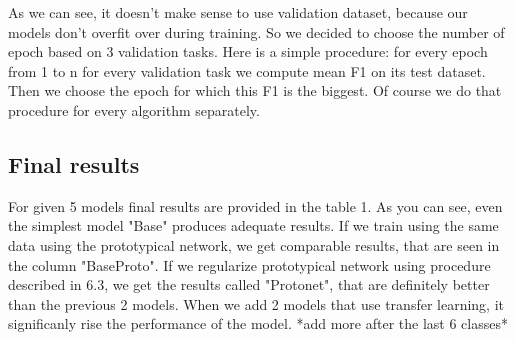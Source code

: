 As we can see, it doesn't make sense to use validation dataset, because our models don't overfit over during training. So we decided to choose the number of epoch based on 3 validation tasks. Here is a simple procedure: for every epoch from 1 to n for every validation task we compute mean F1 on its test dataset. Then we choose the epoch for which this F1 is the biggest. Of course we do that procedure for every algorithm separately.


\subsection{Final results}
For given 5 models final results are provided in the table 1. As you can see, even the simplest model "Base" produces adequate results. If we train using the same data using the prototypical network, we get comparable results, that are seen in the column "BaseProto". 
If we regularize prototypical network using procedure described in 6.3, we get the results called "Protonet", that are definitely better than the previous 2 models. When we add 2 models that use transfer learning, it significanly rise the performance of the model.
*add more after the last 6 classes*

